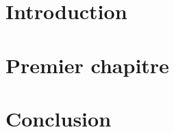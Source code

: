 \documentclass[twoside,UTF8]{EPURapport}
\begin{document}
\chapter{Introduction}

\chapter{Premier chapitre}

\chapter{Conclusion}

\annexes
\end{document}
